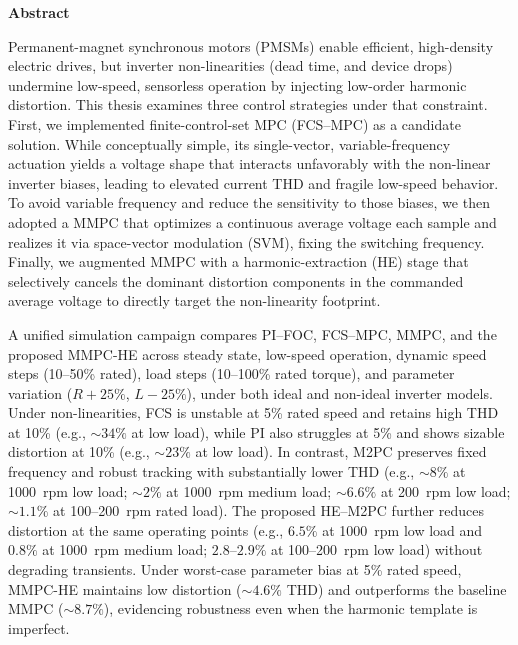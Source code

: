 
\newpage
{}
\begin{center}
	\textbf{\large Abstract}
\end{center} 

Permanent-magnet synchronous motors (PMSMs) enable efficient, high-density electric drives, but inverter non-linearities (dead time, and device drops) undermine low-speed, sensorless operation by injecting low-order harmonic distortion. This thesis examines three control strategies under that constraint. First, we implemented finite-control-set MPC (FCS–MPC) as a candidate solution. While conceptually simple, its single-vector, variable-frequency actuation yields a voltage shape that interacts unfavorably with the non-linear inverter biases, leading to elevated current THD and fragile low-speed behavior. To avoid variable frequency and reduce the sensitivity to those biases, we then adopted a MMPC that optimizes a continuous average voltage each sample and realizes it via space-vector modulation (SVM), fixing the switching frequency. Finally, we augmented MMPC with a harmonic-extraction (HE) stage that selectively cancels the dominant distortion components in the commanded average voltage to directly target the non-linearity footprint.

A unified simulation campaign compares PI–FOC, FCS–MPC, MMPC, and the proposed MMPC-HE across steady state, low-speed operation, dynamic speed steps (10--50\% rated), load steps (10--100\% rated torque), and parameter variation ($R{+}25\%$, $L{-}25\%$), under both ideal and non-ideal inverter models. Under non-linearities, FCS is unstable at 5\% rated speed and retains high THD at 10\% (e.g., $\sim34\%$ at low load), while PI also struggles at 5\% and shows sizable distortion at 10\% (e.g., $\sim23\%$ at low load). In contrast, M2PC preserves fixed frequency and robust tracking with substantially lower THD (e.g., $\sim8\%$ at 1000~rpm low load; $\sim2\%$ at 1000~rpm medium load; $\sim6.6\%$ at 200~rpm low load; $\sim1.1\%$ at 100--200~rpm rated load). The proposed HE–M2PC further reduces distortion at the same operating points (e.g., $6.5\%$ at 1000~rpm low load and $0.8\%$ at 1000~rpm medium load; $2.8$--$2.9\%$ at 100--200~rpm low load) without degrading transients. Under worst-case parameter bias at 5\% rated speed, MMPC-HE maintains low distortion ($\sim4.6\%$ THD) and outperforms the baseline MMPC ($\sim8.7\%$), evidencing robustness even when the harmonic template is imperfect.

